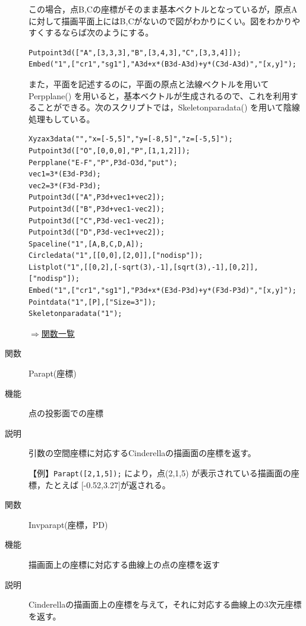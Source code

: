 \documentclass[papersize,a4paper,12pt,uplatex]{jsarticle}
\begin{document}
\begin{description}
この場合，点B,Cの座標がそのまま基本ベクトルとなっているが，原点Aに対して描画平面上にはB,Cがないので図がわかりにくい。図をわかりやすくするならば次のようにする。
\begin{verbatim}
Putpoint3d(["A",[3,3,3],"B",[3,4,3],"C",[3,3,4]]);
Embed("1",["cr1","sg1"],"A3d+x*(B3d-A3d)+y*(C3d-A3d)","[x,y]");
\end{verbatim}

また，平面を記述するのに，平面の原点と法線ベクトルを用いて Perpplane() を用いると，基本ベクトルが生成されるので、これを利用することができる。次のスクリプトでは，Skeletonparadata() を用いて陰線処理もしている。
\begin{verbatim}
Xyzax3data("","x=[-5,5]","y=[-8,5]","z=[-5,5]");
Putpoint3d(["O",[0,0,0],"P",[1,1,2]]);
Perpplane("E-F","P",P3d-O3d,"put");
vec1=3*(E3d-P3d);
vec2=3*(F3d-P3d);
Putpoint3d(["A",P3d+vec1+vec2]);
Putpoint3d(["B",P3d+vec1-vec2]);
Putpoint3d(["C",P3d-vec1-vec2]);
Putpoint3d(["D",P3d-vec1+vec2]);
Spaceline("1",[A,B,C,D,A]);
Circledata("1",[[0,0],[2,0]],["nodisp"]);
Listplot("1",[[0,2],[-sqrt(3),-1],[sqrt(3),-1],[0,2]],["nodisp"]);
Embed("1",["cr1","sg1"],"P3d+x*(E3d-P3d)+y*(F3d-P3d)","[x,y]");
Pointdata("1",[P],["Size=3"]);
Skeletonparadata("1");
\end{verbatim}
 \begin{center}  \end{center}

\begin{flushright} \hyperlink{functionlist}{$\Rightarrow$関数一覧}\end{flushright}

\vspace{\baselineskip}
\hypertarget{parapt}{}
\item[関数]Parapt(座標)
\item[機能]点の投影面での座標
\item[説明]引数の空間座標に対応するCinderellaの描画面の座標を返す。

\vspace{\baselineskip}
【例】\verb|Parapt([2,1,5]);| により，点(2,1,5) が表示されている描画面の座標，たとえば [-0.52,3.27]が返される。
\vspace{\baselineskip}
\hypertarget{invparapt}{}
\item[関数]Invparapt(座標，PD)
\item[機能]描画面上の座標に対応する曲線上の点の座標を返す
\item[説明]Cinderellaの描画面上の座標を与えて，それに対応する曲線上の3次元座標を返す。


\end{description}
\end{document}
